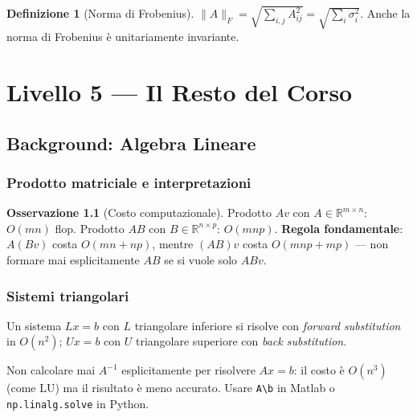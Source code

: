 \documentclass[11pt, a4paper, twoside]{book}
\theoremstyle{definition}
\newtheorem{defn}{Definizione}[chapter]
\newtheorem{remark}{Osservazione}[chapter]
\theoremstyle{plain}
\theoremstyle{remark}
\newcommand{\R}{\mathbb{R}}
\begin{document}
\begin{defn}[Norma di Frobenius]
$\|A\|_F = \sqrt{\sum_{i,j} A_{ij}^2} = \sqrt{\sum_i \sigma_i^2}$. Anche la norma di Frobenius è unitariamente invariante.
\end{defn}


\part{Livello 5 --- Il Resto del Corso}
\label{part:L5}

\chapter{Background: Algebra Lineare}

\section{Prodotto matriciale e interpretazioni}

\begin{remark}[Costo computazionale]
Prodotto $Av$ con $A \in \R^{m \times n}$: $O(mn)$ flop. Prodotto $AB$ con $B \in \R^{n \times p}$: $O(mnp)$. \textbf{Regola fondamentale}: $A(Bv)$ costa $O(mn + np)$, mentre $(AB)v$ costa $O(mnp + mp)$ — non formare mai esplicitamente $AB$ se si vuole solo $ABv$.
\end{remark}

\section{Sistemi triangolari}

Un sistema $Lx = b$ con $L$ triangolare inferiore si risolve con \emph{forward substitution} in $O(n^2)$; $Ux = b$ con $U$ triangolare superiore con \emph{back substitution}.

\begin{warningbox}
Non calcolare mai $A^{-1}$ esplicitamente per risolvere $Ax = b$: il costo è $O(n^3)$ (come LU) ma il risultato è meno accurato. Usare \texttt{A\textbackslash b} in Matlab o \texttt{np.linalg.solve} in Python.
\end{warningbox}
\end{document}
